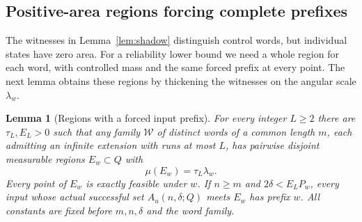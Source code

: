 \documentclass[11pt]{amsart}
\newtheorem{lemma}[theorem]{Lemma}
\theoremstyle{definition}
\theoremstyle{remark}
\numberwithin{equation}{section}
\begin{document}
\subsection{Positive-area regions forcing complete prefixes}
The witnesses in Lemma~\ref{lem:shadow} distinguish control words,
but individual states have zero area. For a reliability lower bound
we need a whole region for each word, with controlled mass and the
same forced prefix at every point. The next lemma obtains these
regions by thickening the witnesses on the angular scale
$\lambda_w$.
\begin{lemma}[Regions with a forced input prefix]\label{lem:massforcing}
For every integer $L\ge2$ there are $\tau_L,E_L>0$ such that
any family $\mathcal W$ of distinct words of a common length $m$,
each admitting an infinite extension with runs at most $L$, has
pairwise disjoint measurable regions $E_w\subset Q$ with
\begin{equation}\label{eq:forcedmass}
\mu(E_w)=\tau_L\lambda_w.
\end{equation}
Every point of $E_w$ is exactly feasible under $w$.
If $n\ge m$ and $2\delta<E_LP_w$, every input whose actual
successful set $A_u(n,\delta;Q)$ meets $E_w$ has prefix $w$.
All constants are fixed before $m,n,\delta$ and the word family.
\end{lemma}
\end{document}
